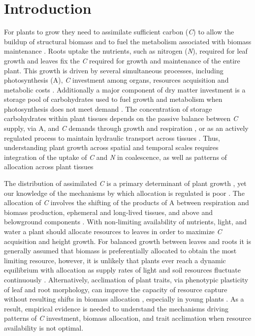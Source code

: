 \documentclass[a4paper]{article}\usepackage[]{graphicx}\usepackage[]{color}
\begin{document}
\section*{Introduction}

For plants to grow they need to assimilate sufficient carbon (\textit{C}) to allow the buildup of structural biomass and to fuel the metabolism associated with biomass maintenance \citep{sala2012carbon}.  Roots uptake the nutrients, such as nitrogen (\textit{N}), required for leaf growth and leaves fix the \textit{C} required for growth and maintenance of the entire plant. This growth is driven by several simultaneous processes, including photosynthesis (A), \textit{C} investment among organs, resources acquisition and metabolic costs \citep{korner2006plant, fourcaud2008plant}. Additionally a major component of dry matter investment is a storage pool of carbohydrates used to fuel growth and metabolism when photosynthesis does not meet demand \citep{chapin1990ecology}. The concentration of storage carbohydrates within plant tissues depends on the passive balance between \textit{C} supply, via A, and \textit{C} demands through growth and respiration \citep{mitchell2013drought}, or as an actively regulated process to maintain hydraulic transport across tissues \citep{sala2012carbon}. Thus, understanding plant growth across spatial and temporal scales requires integration of the uptake of \textit{C} and \textit{N} in coalescence, as well as patterns of allocation across plant tissues 

The distribution of assimilated \textit{C} is a primary determinant of plant growth \citep{friedlingstein1999toward}, yet our knowledge of the mechanisms by which allocation is regulated is poor \citep{poorter2012biomass}. The allocation of \textit{C} involves the shifting of the products of A between respiration and biomass production, ephemeral and long-lived tissues, and above and belowground components \citep{litton2007carbon}. With non-limiting availability of nutrients, light, and water a plant should allocate resources to leaves in order to maximize \textit{C} acquisition and height growth.  For balanced growth between leaves and roots it is generally assumed that biomass is preferentially allocated to obtain the most limiting resource, however, it is unlikely that plants ever reach a dynamic equilibrium with allocation as supply rates of light and soil resources fluctuate continuously \citep{shipley2002balanced}. Alternatively, acclimation of plant traits, via phenotypic plasticity of leaf and root morphology, can improve the capacity of resource capture without resulting shifts in biomass allocation \citep{waisel1996plant}, especially in young plants \citep{reich2002root}.  As a result, empirical evidence is needed to understand the mechanisms driving patterns of \textit{C} investment, biomass allocation, and trait acclimation when resource availability is not optimal.
\end{document}
